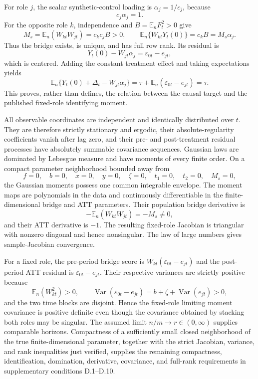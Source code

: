 For role \(j\), the scalar synthetic-control loading is \(\alpha_j=1/c_j\), because
\[
 c_j\alpha_j=1.
\]
For the opposite role \(k\), independence and \(B=\mathbb E_nF_t^2>0\) give
\[
 M_s=\mathbb E_n(W_{kt}W_{jt})
     =c_kc_jB>0,
\qquad
 \mathbb E_n\{W_{kt}Y_t(0)\}=c_kB=M_s\alpha_j.
\]
Thus the bridge exists, is unique, and has full row rank.  Its residual is
\[
 Y_t(0)-W_{jt}\alpha_j=\varepsilon_{0t}-e_{jt},
\]
which is centered.  Adding the constant treatment effect and taking expectations yields
\[
 \mathbb E_n\{Y_t(0)+\Delta_t-W_{jt}\alpha_j\}
 =\tau+\mathbb E_n(\varepsilon_{0t}-e_{jt})=\tau.
\]
This proves, rather than defines, the relation between the causal target and the published fixed-role identifying moment.

All observable coordinates are independent and identically distributed over \(t\).  They are therefore strictly stationary and ergodic, their absolute-regularity coefficients vanish after lag zero, and their pre- and post-treatment residual processes have absolutely summable covariance sequences.  Gaussian laws are dominated by Lebesgue measure and have moments of every finite order.  On a compact parameter neighborhood bounded away from
\[
 f=0,\quad b=0,\quad x=0,\quad y=0,\quad \zeta=0,\quad
 t_1=0,\quad t_2=0,\quad M_s=0,
\]
the Gaussian moments possess one common integrable envelope.  The moment maps are polynomials in the data and continuously differentiable in the finite-dimensional bridge and ATT parameters.  Their population bridge derivative is
\[
 -\mathbb E_n(W_{kt}W_{jt})=-M_s\neq0,
\]
and their ATT derivative is \(-1\).  The resulting fixed-role Jacobian is triangular with nonzero diagonal and hence nonsingular.  The law of large numbers gives sample-Jacobian convergence.

For a fixed role, the pre-period bridge score is \(W_{kt}(\varepsilon_{0t}-e_{jt})\) and the post-period ATT residual is \(\varepsilon_{0t}-e_{jt}\).  Their respective variances are strictly positive because
\[
 \mathbb E_n(W_{kt}^2)>0,\qquad
 \operatorname{Var}(\varepsilon_{0t}-e_{jt})
 =b+\zeta+\operatorname{Var}(e_{jt})>0,
\]
and the two time blocks are disjoint.  Hence the fixed-role limiting moment covariance is positive definite even though the covariance obtained by stacking both roles may be singular.  The assumed limit \(n/m\to r\in(0,\infty)\) supplies comparable horizons.  Compactness of a sufficiently small closed neighborhood of the true finite-dimensional parameter, together with the strict Jacobian, variance, and rank inequalities just verified, supplies the remaining compactness, identification, domination, derivative, covariance, and full-rank requirements in supplementary conditions D.1--D.10.

